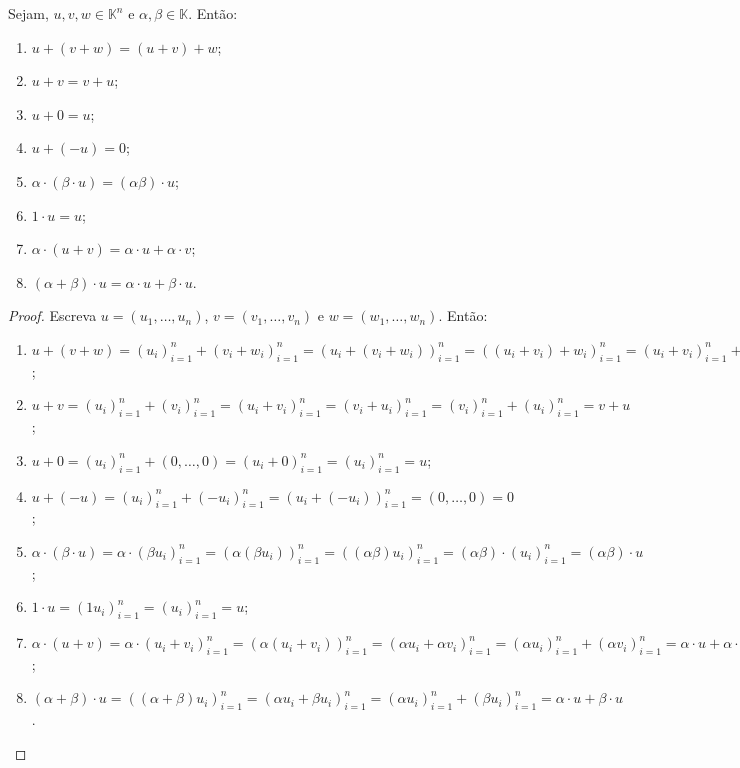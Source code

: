 \begin{proposition}
    Sejam, $u, v, w \in \mathbb K^n$ e $\alpha, \beta \in \mathbb K$. Então:
    \begin{enumerate}[label=(\roman*)]
        \item $u + (v + w) = (u + v) + w$;
        \item $u + v = v + u$;
        \item $u + 0 = u$;
        \item $u + (-u) = 0$;
        \item $\alpha \cdot (\beta \cdot u) = (\alpha \beta) \cdot u$;
        \item $1 \cdot u = u$;
        \item $\alpha \cdot (u + v) = \alpha \cdot u + \alpha \cdot v$;
        \item $(\alpha + \beta) \cdot u = \alpha \cdot u + \beta \cdot u$.
    \end{enumerate}
\end{proposition}
\begin{proof}
    Escreva $u=(u_1, \dots, u_n)$, $v=(v_1, \dots, v_n)$ e $w=(w_1, \dots, w_n)$.
    Então:
    \begin{enumerate}[label=(\roman*)]
        \item $u + (v + w) = (u_i)_{i=1}^n + (v_i + w_i)_{i=1}^n = (u_i + (v_i + w_i))_{i=1}^n = ((u_i + v_i) + w_i)_{i=1}^n = (u_i + v_i)_{i=1}^n + (w_i)_{i=1}^n = (u + v) + w$;
        \item $u + v = (u_i)_{i=1}^n + (v_i)_{i=1}^n = (u_i + v_i)_{i=1}^n = (v_i + u_i)_{i=1}^n = (v_i)_{i=1}^n + (u_i)_{i=1}^n = v + u$;
        \item $u + 0 = (u_i)_{i=1}^n + (0, \dots, 0) = (u_i + 0)_{i=1}^n = (u_i)_{i=1}^n = u$;
        \item $u + (-u) = (u_i)_{i=1}^n + (-u_i)_{i=1}^n = (u_i + (-u_i))_{i=1}^n = (0, \dots, 0) = 0$;
        \item $\alpha \cdot (\beta \cdot u) = \alpha \cdot (\beta u_i)_{i=1}^n = (\alpha (\beta u_i))_{i=1}^n = ((\alpha \beta) u_i)_{i=1}^n = (\alpha \beta) \cdot (u_i)_{i=1}^n = (\alpha \beta) \cdot u$;
        \item $1 \cdot u = (1 u_i)_{i=1}^n = (u_i)_{i=1}^n = u$;
        \item $\alpha \cdot (u + v) = \alpha \cdot (u_i + v_i)_{i=1}^n = (\alpha (u_i + v_i))_{i=1}^n = (\alpha u_i + \alpha v_i)_{i=1}^n = (\alpha u_i)_{i=1}^n + (\alpha v_i)_{i=1}^n = \alpha \cdot u + \alpha \cdot v$;
        \item $(\alpha + \beta) \cdot u = ((\alpha + \beta) u_i)_{i=1}^n = (\alpha u_i + \beta u_i)_{i=1}^n = (\alpha u_i)_{i=1}^n + (\beta u_i)_{i=1}^n = \alpha \cdot u + \beta \cdot u$.
    \end{enumerate}
\end{proof}


